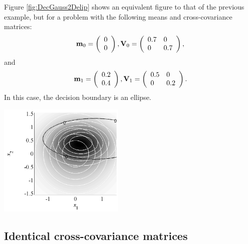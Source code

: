 \begin{example}
	Figure \ref{fig:DecGauss2Delip} shows an equivalent figure to that of the previous example, but for a problem with the following means and cross-covariance matrices:
		\begin{equation*}
	{\bf m}_0 =  \left(\begin{array}{l}  0\\0  \end{array}\right), {\bf V}_0 = 
	\left(\begin{array}{ll} 0.7 & 0 \\ 0 & 0.7 \end{array} \right),
	\end{equation*}
	and
	\begin{equation*}
	{\bf m}_1 = \left(\begin{array}{l}  0.2 \\ 0.4 \end{array}\right), {\bf V}_1 = 
	\left(\begin{array}{ll} 0.5 & 0 \\ 0 & 0.2 \end{array} \right).
	\end{equation*}
	In this case, the decision boundary is an ellipse.
		\begin{center}
			\includegraphics[width=6cm]{Figures/DecGauss2Delip.pdf}
			\label{fig:DecGauss2Delip}
		\end{center}
\end{example}

\subsection{Identical cross-covariance matrices}

